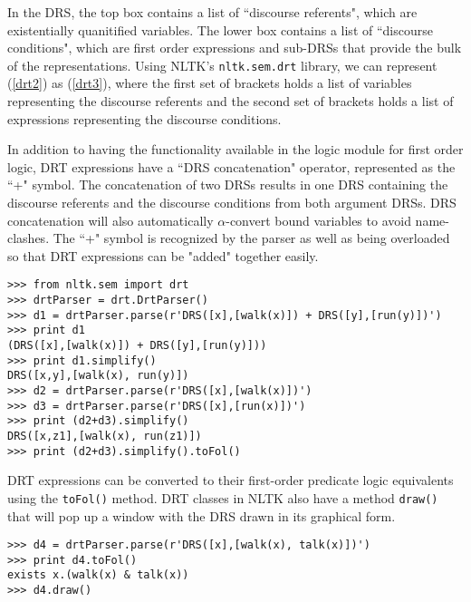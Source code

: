 \documentclass{article}
\newcommand{\dhgdrs}[2]
{
    {
    \it
    \begin{tabular}{|l|}
    \hline
    ~ \vspace{-2ex} \\
    #1
    \\
    ~ \vspace{-2ex} \\
    \hline
    ~ \vspace{-2ex} \\
    #2
    \\
    ~ \\    %
    \hline
    \end{tabular}
    }
}
\newcommand{\dhgcode}[1]{{\tt #1}}
\begin{document}
\enumsentence{\label{drt2}\dhgdrs{j,d}{(John = j)\\dog(d)\\sees(j,d)}}

In the DRS, the top box contains a list of ``discourse referents", which are existentially quanitified variables.  The lower box contains a list of ``discourse conditions", which are first order expressions and sub-DRSs that provide the bulk of the representations.  Using NLTK's \dhgcode{nltk.sem.drt} library, we can represent (\ref{drt2}) as (\ref{drt3}), where the first set of brackets holds a list of variables representing the discourse referents and the second set of brackets holds a list of expressions representing the discourse conditions.

\enumsentence{\label{drt3}\dhgcode{DRS([j,d],[(John = j), dog(d), sees(j,d)])}}

In addition to having the functionality available in the logic module for first order logic, DRT expressions have a ``DRS concatenation" operator, represented as the ``+" symbol.  The concatenation of two DRSs results in one DRS containing the discourse referents and the discourse conditions from both argument DRSs.  DRS concatenation will also automatically $\alpha$-convert bound variables to avoid name-clashes.  The ``+" symbol is recognized by the parser as well as being overloaded so that DRT expressions can be "added" together easily.

\begin{verbatim}
>>> from nltk.sem import drt
>>> drtParser = drt.DrtParser()
>>> d1 = drtParser.parse(r'DRS([x],[walk(x)]) + DRS([y],[run(y)])')
>>> print d1
(DRS([x],[walk(x)]) + DRS([y],[run(y)]))
>>> print d1.simplify()
DRS([x,y],[walk(x), run(y)])
>>> d2 = drtParser.parse(r'DRS([x],[walk(x)])')
>>> d3 = drtParser.parse(r'DRS([x],[run(x)])')
>>> print (d2+d3).simplify()
DRS([x,z1],[walk(x), run(z1)])
>>> print (d2+d3).simplify().toFol()
\end{verbatim}

DRT expressions can be converted to their first-order predicate logic equivalents using the \dhgcode{toFol()} method.  DRT classes in NLTK also have a method \dhgcode{draw()} that will pop up a window with the DRS drawn in its graphical form.

\begin{verbatim}
>>> d4 = drtParser.parse(r'DRS([x],[walk(x), talk(x)])')
>>> print d4.toFol()
exists x.(walk(x) & talk(x))
>>> d4.draw()
\end{verbatim}
\end{document}
